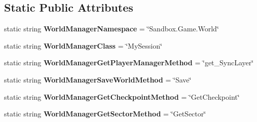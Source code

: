 \subsection*{Static Public Attributes}
\begin{DoxyCompactItemize}
\item 
\hypertarget{class_s_e_mod_a_p_i_internal_1_1_a_p_i_1_1_common_1_1_world_manager_aceb62fa6aef9cbb87cf63af362fc309c}{}static string {\bfseries World\+Manager\+Namespace} = \char`\"{}Sandbox.\+Game.\+World\char`\"{}\label{class_s_e_mod_a_p_i_internal_1_1_a_p_i_1_1_common_1_1_world_manager_aceb62fa6aef9cbb87cf63af362fc309c}

\item 
\hypertarget{class_s_e_mod_a_p_i_internal_1_1_a_p_i_1_1_common_1_1_world_manager_a987b189ab32d7ec8e2279234ceea504e}{}static string {\bfseries World\+Manager\+Class} = \char`\"{}My\+Session\char`\"{}\label{class_s_e_mod_a_p_i_internal_1_1_a_p_i_1_1_common_1_1_world_manager_a987b189ab32d7ec8e2279234ceea504e}

\item 
\hypertarget{class_s_e_mod_a_p_i_internal_1_1_a_p_i_1_1_common_1_1_world_manager_a0964ee4cd16d4a6763f3714d76d90368}{}static string {\bfseries World\+Manager\+Get\+Player\+Manager\+Method} = \char`\"{}get\+\_\+\+Sync\+Layer\char`\"{}\label{class_s_e_mod_a_p_i_internal_1_1_a_p_i_1_1_common_1_1_world_manager_a0964ee4cd16d4a6763f3714d76d90368}

\item 
\hypertarget{class_s_e_mod_a_p_i_internal_1_1_a_p_i_1_1_common_1_1_world_manager_ac8119325b8e177e1d2dce2e89e21b25f}{}static string {\bfseries World\+Manager\+Save\+World\+Method} = \char`\"{}Save\char`\"{}\label{class_s_e_mod_a_p_i_internal_1_1_a_p_i_1_1_common_1_1_world_manager_ac8119325b8e177e1d2dce2e89e21b25f}

\item 
\hypertarget{class_s_e_mod_a_p_i_internal_1_1_a_p_i_1_1_common_1_1_world_manager_a581e64d758fbe6235db731529cce98a7}{}static string {\bfseries World\+Manager\+Get\+Checkpoint\+Method} = \char`\"{}Get\+Checkpoint\char`\"{}\label{class_s_e_mod_a_p_i_internal_1_1_a_p_i_1_1_common_1_1_world_manager_a581e64d758fbe6235db731529cce98a7}

\item 
\hypertarget{class_s_e_mod_a_p_i_internal_1_1_a_p_i_1_1_common_1_1_world_manager_a6f66612cf664033fb24a8e783dd5e992}{}static string {\bfseries World\+Manager\+Get\+Sector\+Method} = \char`\"{}Get\+Sector\char`\"{}\label{class_s_e_mod_a_p_i_internal_1_1_a_p_i_1_1_common_1_1_world_manager_a6f66612cf664033fb24a8e783dd5e992}


\end{DoxyCompactItemize}
